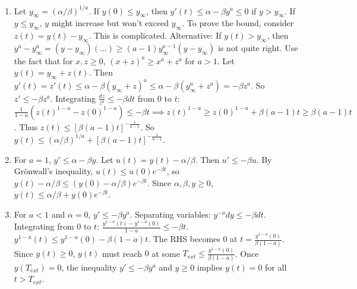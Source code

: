 \begin{solution}
\begin{enumerate}
    \item[(a)] Let $y_\infty = (\alpha/\beta)^{1/a}$. If $y(0) \le y_\infty$, then $y'(t) \le \alpha - \beta y^a \le 0$ if $y > y_\infty$. If $y \le y_\infty$, $y$ might increase but won't exceed $y_\infty$.
    To prove the bound, consider $z(t) = y(t) - y_\infty$. This is complicated.
    Alternative: If $y(t) > y_\infty$, then $y^a - y_\infty^a = (y-y_\infty)(\dots) \ge (a-1) y_\infty^{a-1} (y-y_\infty)$ is not quite right.
    Use the fact that for $x, z \ge 0$, $(x+z)^a \ge x^a + z^a$ for $a > 1$.
    Let $y(t) = y_\infty + z(t)$. Then $y'(t) = z'(t) \le \alpha - \beta (y_\infty + z)^a \le \alpha - \beta (y_\infty^a + z^a) = -\beta z^a$.
    So $z' \le -\beta z^a$. Integrating $\frac{dz}{z^a} \le -\beta dt$ from $0$ to $t$:
    $\frac{1}{1-a} (z(t)^{1-a} - z(0)^{1-a}) \le -\beta t \implies z(t)^{1-a} \ge z(0)^{1-a} + \beta(a-1)t \ge \beta(a-1)t$.
    Thus $z(t) \le [\beta(a-1)t]^{-\frac{1}{a-1}}$.
    So $y(t) \le (\alpha/\beta)^{1/a} + [\beta(a-1)t]^{-\frac{1}{a-1}}$.
    
    \item[(b)] For $a=1$, $y' \le \alpha - \beta y$.
    Let $u(t) = y(t) - \alpha/\beta$. Then $u' \le -\beta u$.
    By Gr\"onwall's inequality, $u(t) \le u(0) e^{-\beta t}$, so $y(t) - \alpha/\beta \le (y(0) - \alpha/\beta) e^{-\beta t}$.
    Since $\alpha, \beta, y \ge 0$, $y(t) \le \alpha/\beta + y(0) e^{-\beta t}$.
    
    \item[(c)] For $a < 1$ and $\alpha = 0$, $y' \le -\beta y^a$.
    Separating variables: $y^{-a} dy \le -\beta dt$.
    Integrating from $0$ to $t$: $\frac{y^{1-a}(t) - y^{1-a}(0)}{1-a} \le -\beta t$.
    $y^{1-a}(t) \le y^{1-a}(0) - \beta(1-a)t$.
    The RHS becomes $0$ at $t = \frac{y^{1-a}(0)}{\beta(1-a)}$.
    Since $y(t) \ge 0$, $y(t)$ must reach $0$ at some $T_{ext} \le \frac{y^{1-a}(0)}{\beta(1-a)}$.
    Once $y(T_{ext}) = 0$, the inequality $y' \le -\beta y^a$ and $y \ge 0$ implies $y(t) = 0$ for all $t > T_{ext}$.
\end{enumerate}
\end{solution}

